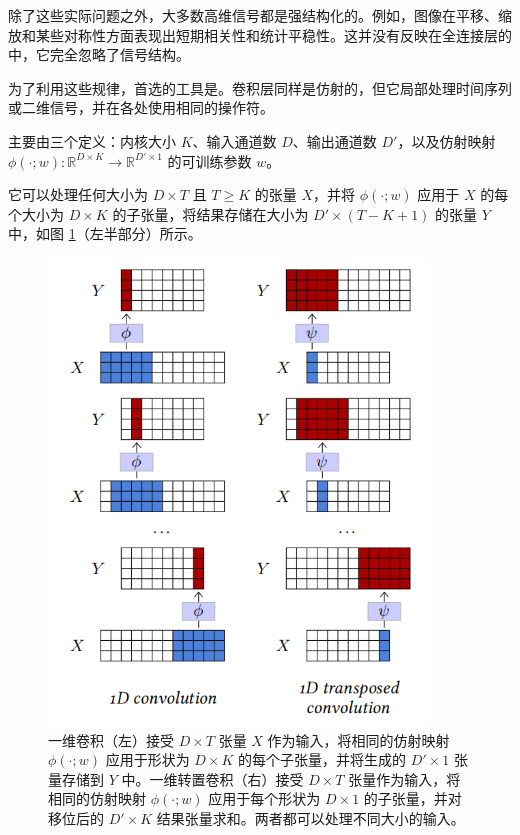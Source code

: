 除了这些实际问题之外，大多数高维信号都是强结构化的。例如，图像在平移、缩放和某些对称性方面表现出短期相关性和统计平稳性。这并没有反映在全连接层的中，它完全忽略了信号结构。

为了利用这些规律，首选的工具是。卷积层同样是仿射的，但它局部处理时间序列或二维信号，并在各处使用相同的操作符。

主要由三个定义：内核大小 $K$、输入通道数 $D$、输出通道数 $D'$，以及仿射映射 $\phi(\cdot;w):\mathbb{R}^{D \times K} \to \mathbb{R}^{D' \times 1}$ 的可训练参数 $w$。

它可以处理任何大小为 $D \times T$ 且 $T \ge K$ 的张量 $X$，并将 $\phi(\cdot;w)$ 应用于 $X$ 的每个大小为 $D \times K$ 的子张量，将结果存储在大小为 $D' \times (T-K+1)$ 的张量 $Y$ 中，如图 \ref{fig4.1}（左半部分）所示。

\newpage

\begin{figure}[h]
    \centering
    \includegraphics[width=0.9\textwidth]{fig/fig4.1.png}
    \caption[一维卷积]{一维卷积（左）接受 $D \times T$ 张量 $X$ 作为输入，将相同的仿射映射 $\phi(\cdot;w)$ 应用于形状为 $D \times K$ 的每个子张量，并将生成的 $D' \times 1$ 张量存储到 $Y$ 中。一维转置卷积（右）接受 $D \times T$ 张量作为输入，将相同的仿射映射 $\phi(\cdot;w)$ 应用于每个形状为 $D \times 1$ 的子张量，并对移位后的 $D' \times K$ 结果张量求和。两者都可以处理不同大小的输入。}
    \label{fig4.1}
\end{figure}

